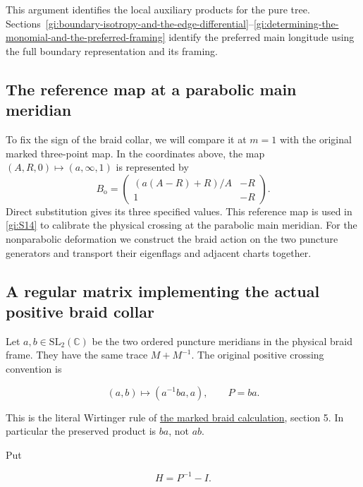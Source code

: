 This argument identifies the local auxiliary products for the
pure tree. Sections~\ref{gi:boundary-isotropy-and-the-edge-differential}--\ref{gi:determining-the-monomial-and-the-preferred-framing} identify the preferred main longitude
using the full boundary representation and its framing.

\subsection{The reference map at a parabolic main meridian}\label{gi:parabolic-reference-map}

To fix the sign of the braid collar, we will compare it at \(m=1\)
with the original marked three-point map. In the coordinates above,
the map \((A,R,0)\mapsto(a,\infty,1)\) is represented by
\begin{equation}\label{gi:S6}
 B_{\mathrm o}=
 \begin{pmatrix}(a(A-R)+R)/A&-R\\1&-R\end{pmatrix}.
\end{equation}
Direct substitution gives its three specified values. This reference
map is used in \eqref{gi:S14} to calibrate the physical crossing at
the parabolic main meridian. For the nonparabolic deformation we
construct the braid action on the two puncture generators and
transport their eigenflags and adjacent charts together.

\subsection{A regular matrix implementing the actual positive braid collar}\label{gi:a-regular-matrix-implementing-the-actual-positive-braid-collar}

Let \(a,b\in\mathrm{SL}_2(\mathbb C)\) be the two ordered
puncture meridians in the physical braid frame. They have the
same trace \(M+M^{-1}\). The original positive crossing
convention is

\begin{equation}\label{gi:S8}
(a,b)\longmapsto(a^{-1}ba,a),\qquad P=ba.
\end{equation}

This is the literal Wirtinger rule of
\href{https://sashakolpakov.github.io/murakamis_dream/notes/marked_braid_holonomy.html}{the marked braid calculation},
section 5. In particular the preserved product is \(ba\),
not \(ab\).

Put

\begin{equation}\label{gi:S9}
H=P^{-1}-I.
\end{equation}

